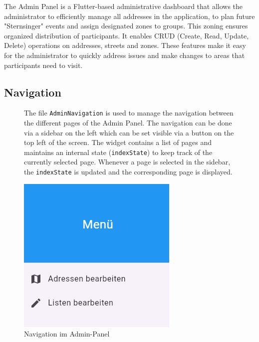 \Author{\daAuthorOne}


The Admin Panel is a Flutter-based administrative dashboard that allows the administrator to efficiently manage all addresses in the application, to plan  future "Sternsinger" events and assign designated zones to groups. This zoning ensures organized distribution of participants. It enables CRUD (Create, Read, Update, Delete) operations on addresses, streets and zones. These features make it easy for the administrator to quickly address issues and make changes to areas that participants need to visit.

\subsection{Navigation}

\noindent

\begin{figure}[H]

\begin{minipage}{0.58\textwidth}
    The file \texttt{AdminNavigation} is used to manage the navigation between the different pages of the Admin Panel. The navigation can be done via a sidebar on the left which can be set visible via a button on the top left of the screen. The widget contains a list of pages and maintains an internal state (\texttt{indexState}) to keep track of the currently selected page. Whenever a page is selected in the sidebar, the \texttt{indexState} is updated and the corresponding page is displayed.
    \end{minipage}
    \hfill
    \begin{minipage}{0.38\textwidth}
    \centering
    \includegraphics[width=0.7\linewidth]{images/AdminPanel/Menu.png}
    \caption{Navigation im Admin-Panel}
    \label{fig:adminpanel_navigation}
\end{minipage}

\end{figure}



